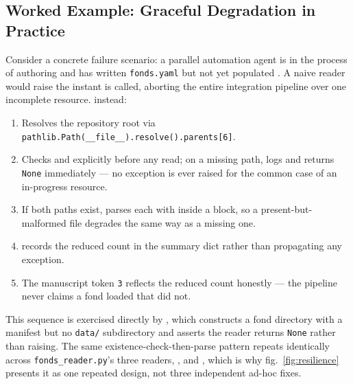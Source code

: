 \documentclass[
]{article}
\newcounter{none} %
\providecommand{\tightlist}{%
  \setlength{\itemsep}{0pt}\setlength{\parskip}{0pt}}
\begin{document}
\subsection{Worked Example: Graceful Degradation in
Practice}\label{worked-example-graceful-degradation-in-practice}

Consider a concrete failure scenario: a parallel automation agent is in
the process of authoring 
and has written \texttt{fonds.yaml} but not yet populated
. A naive reader would raise
 the instant 
is called, aborting the entire integration pipeline over one incomplete
resource.  instead:

\begin{enumerate}
\def\labelenumi{\arabic{enumi}.}
\tightlist
\item
  Resolves the repository root via
  \texttt{pathlib.Path(\_\_file\_\_).resolve().parents{[}6{]}}.
\item
  Checks  and
   explicitly before any read; on a
  missing path, logs
   and
  returns \texttt{None} immediately --- no exception is ever raised for
  the common case of an in-progress resource.
\item
  If both paths exist, parses each with 
  inside a
  block, so a present-but-malformed file degrades the same way as a
  missing one.
\item
   records the reduced count in the
  summary dict rather than propagating any exception.
\item
  The manuscript token \texttt{3} reflects the reduced count honestly
  --- the pipeline never claims a fond loaded that did not.
\end{enumerate}

This sequence is exercised directly by
,
which constructs a fond directory with a manifest but no \texttt{data/}
subdirectory and asserts the reader returns \texttt{None} rather than
raising. The same existence-check-then-parse pattern repeats identically
across \texttt{fonds\_reader.py}'s three readers,
, and , which is why
fig.~\ref{fig:resilience} presents it as one repeated design, not three
independent ad-hoc fixes.
\end{document}
